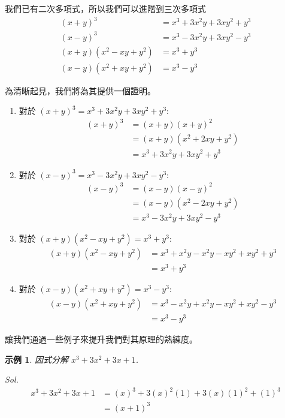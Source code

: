 \documentclass[12pt]{article}
\newtheorem{example}{示例}
\begin{document}
    我們已有二次多項式，所以我們可以進階到三次多項式\begin{align*}
        (x+y)^3&=x^3+3x^2y+3xy^2+y^3\\
        (x-y)^3&=x^3-3x^2y+3xy^2-y^3\\
        (x+y)(x^2-xy+y^2)&=x^3+y^3\\
        (x-y)(x^2+xy+y^2)&=x^3-y^3
    \end{align*}

    為清晰起見，我們將為其提供一個證明。\begin{enumerate}
        \item 對於 $(x+y)^3=x^3+3x^2y+3xy^2+y^3$:\begin{align*}
            (x+y)^3&=(x+y)(x+y)^2\\
            &=(x+y)(x^2+2xy+y^2)\\
            &=x^3+3x^2y+3xy^2+y^3
        \end{align*}
        \item 對於 $(x-y)^3=x^3-3x^2y+3xy^2-y^3$:\begin{align*}
            (x-y)^3&=(x-y)(x-y)^2\\
            &=(x-y)(x^2-2xy+y^2)\\
            &=x^3-3x^2y+3xy^2-y^3
        \end{align*}
        \item 對於 $(x+y)(x^2-xy+y^2)=x^3+y^3$:\begin{align*}
            (x+y)(x^2-xy+y^2)&=x^3+x^2y-x^2y-xy^2+xy^2+y^3\\
            &=x^3+y^3
        \end{align*}
        \item 對於 $(x-y)(x^2+xy+y^2)=x^3-y^3$:\begin{align*}
            (x-y)(x^2+xy+y^2)&=x^3-x^2y+x^2y-xy^2+xy^2-y^3\\
            &=x^3-y^3
        \end{align*}
    \end{enumerate}
    
    讓我們通過一些例子來提升我們對其原理的熟練度。

    \begin{example}
        因式分解 $x^3+3x^2+3x+1$.
    \end{example}
    \textit{ Sol. }\begin{align*}
        x^3+3x^2+3x+1&=(x)^3+3(x)^2(1)+3(x)(1)^2+(1)^3\\
        &=(x+1)^3
    \end{align*}
\end{document}
